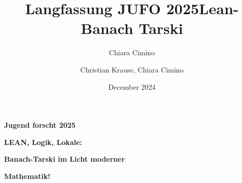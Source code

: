 \documentclass{article}
\title{Langfassung JUFO 2025}
\author{Chiara Cimino}
\date{December 2024}
\title{Lean-Banach Tarski}
\author{Christian Krause, Chiara Cimino}
\begin{document}
\fancyhf{}




\renewcommand{\headrulewidth}{0pt}

\renewcommand{\footrulewidth}{0.1pt}

 



\thispagestyle{empty}

\begin{center}

\vspace{-2cm}

\textbf{\Huge{\sc Jugend forscht 2025}}\\

\vspace{1.4cm}

\textbf{\Huge{LEAN, Logik, Lokale:}}
\vspace{0.2 cm}

\textbf{\Huge{Banach-Tarski im Licht moderner}}
\vspace{0.3 cm}

\textbf{\Huge{Mathematik!}}

\vspace{0.5 cm}



\vspace{0.4 cm}

\end{center}

 

 
\end{document}
